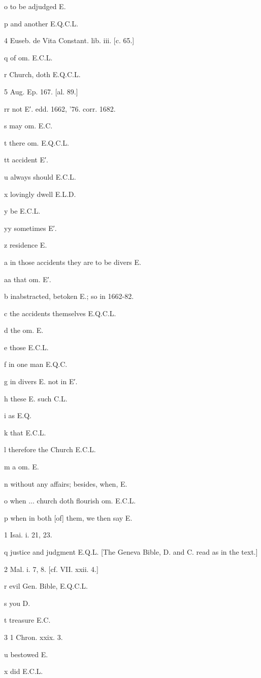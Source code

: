o
to be adjudged E.

p
and another E.Q.C.L.

4
Euseb. de Vita Constant. lib. iii. [c. 65.]

q
of om. E.C.L.

r
Church, doth E.Q.C.L.

5
Aug. Ep. 167. [al. 89.]

rr
not E′. edd. 1662, ’76. corr. 1682.

s
may om. E.C.

t
there om. E.Q.C.L.

tt
accident E′.

u
always should E.C.L.

x
lovingly dwell E.L.D.

y
be E.C.L.

yy
sometimes E′.

z
residence E.

a
in those accidents they are to be divers E.

aa
that om. E′.

b
inabstracted, betoken E.; so in 1662-82.

c
the accidents themselves E.Q.C.L.

d
the om. E.

e
those E.C.L.

f
in one man E.Q.C.

g
in divers E. not in E′.

h
these E. such C.L.

i
as E.Q.

k
that E.C.L.

l
therefore the Church E.C.L.

m
a om. E.

n
without any affairs; besides, when, E.

o
when ... church doth flourish om. E.C.L.

p
when in both [of] them, we then say E.

1
Isai. i. 21, 23.

q
justice and judgment E.Q.L. [The Geneva Bible, D. and C. read as in the text.]

2
Mal. i. 7, 8. [cf. VII. xxii. 4.]

r
evil Gen. Bible, E.Q.C.L.

s
you D.

t
treasure E.C.

3
1 Chron. xxix. 3.

u
bestowed E.

x
did E.C.L.

